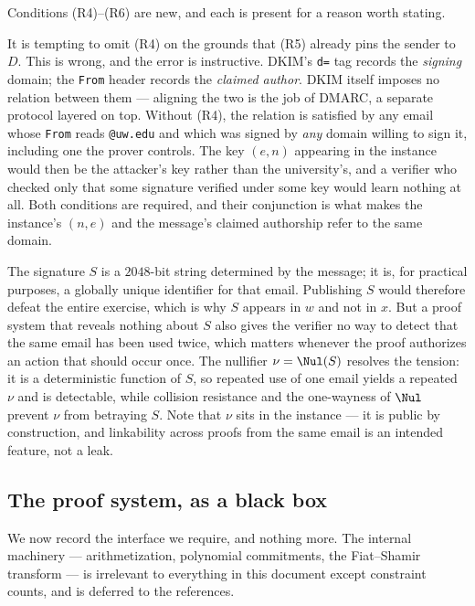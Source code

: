 \documentclass[12pt,reqno]{amsart}
\theoremstyle{definition}
\begin{document}
Conditions (R4)--(R6) are new, and each is present for a reason worth stating.
 
\begin{remark}
It is tempting to omit (R4) on the grounds that (R5) already pins the sender to
$D$. This is wrong, and the error is instructive. DKIM's \texttt{d=} tag records
the \emph{signing} domain; the \texttt{From} header records the \emph{claimed
author}. DKIM itself imposes no relation between them --- aligning the two is the
job of DMARC, a separate protocol layered on top. Without (R4), the relation is
satisfied by any email whose \texttt{From} reads \texttt{@uw.edu} and which was
signed by \emph{any} domain willing to sign it, including one the prover
controls. The key $(e,n)$ appearing in the instance would then be the attacker's
key rather than the university's, and a verifier who checked only that some
signature verified under some key would learn nothing at all. Both conditions are
required, and their conjunction is what makes the instance's $(n,e)$ and the
message's claimed authorship refer to the same domain.
\end{remark}
 
\begin{remark}
The signature $S$ is a $2048$-bit string determined by the message; it is, for
practical purposes, a globally unique identifier for that email. Publishing $S$
would therefore defeat the entire exercise, which is why $S$ appears in $w$ and
not in $x$. But a proof system that reveals nothing about $S$ also gives the
verifier no way to detect that the same email has been used twice, which matters
whenever the proof authorizes an action that should occur once. The nullifier
$\nu = \Nul(S)$ resolves the tension: it is a deterministic function of $S$, so
repeated use of one email yields a repeated $\nu$ and is detectable, while
collision resistance and the one-wayness of $\Nul$ prevent $\nu$ from betraying
$S$. Note that $\nu$ sits in the instance --- it is public by construction, and
linkability across proofs from the same email is an intended feature, not a leak.
\end{remark}
 
\subsection{The proof system, as a black box}
 
We now record the interface we require, and nothing more. The internal machinery
--- arithmetization, polynomial commitments, the Fiat--Shamir transform --- is
irrelevant to everything in this document except constraint counts, and is
deferred to the references.
 
\end{document}

